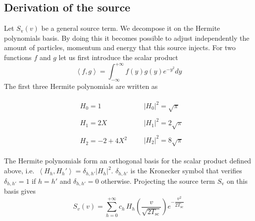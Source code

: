 \documentclass[11pt]{article}
\begin{document}
\subsection{Derivation of the source}
\label{sub:derivation_of_the_source_expression}

Let $S_\mathrm{v}(v)$ be a general source term. We decompose it on the Hermite polynomials basis. By doing this it becomes possible to adjust independently the amount of particles, momentum and energy that this source injects. For two functions $f$ and $g$ let us first introduce the scalar product
%
\begin{equation}
    \left< f,g\right> = \int_{-\infty}^{+\infty} f(y) g(y) e^{-y^2} dy
\end{equation}
%
The first three Hermite polynomials are written as
%
\begin{adjustwidth}{1.2cm}{1.2cm}
\begin{align*}
    &
    \begin{aligned}
        H_0 = 1
    \end{aligned} 
    &&
    \begin{aligned}
        \left| H_0 \right|^2 = \sqrt{\pi} 
    \end{aligned}\\
    &
    \begin{aligned}
        H_1 = 2X    
    \end{aligned} 
    &&
    \begin{aligned}
        \left| H_1 \right| ^2 = 2 \sqrt{\pi} 
    \end{aligned}\\
    &
    \begin{aligned}
        H_2 = - 2 + 4X^2
    \end{aligned}
    &&
    \begin{aligned}
        \left| H_2 \right| ^2 = 8 \sqrt{\pi} 
    \end{aligned}
\end{align*}
\end{adjustwidth}
%
The Hermite polynomials form an orthogonal basis for the scalar product defined above, i.e.\  $\left< H_h, H_h'\right> = \delta_{h,h'} |H_h|^2$. $\delta_{h,h'}$ is the Kronecker symbol that verifies $\delta_{h,h'} = 1$ if $h=h'$ and $\delta_{h,h'} = 0$ otherwise. Projecting the source term $S_\mathrm{v}$ on this basis gives
%
\begin{equation}\label{eq:source_expansion}
     S_{v}(v) = \sum\limits_{h = 0}^{+\infty} c_h \, H_h \left( \dfrac{v}{\sqrt{2 T_\mathrm{sc}} } \right) e^{- \dfrac{v^2}{2 T_\mathrm{sc}}}
\end{equation}
\end{document}
